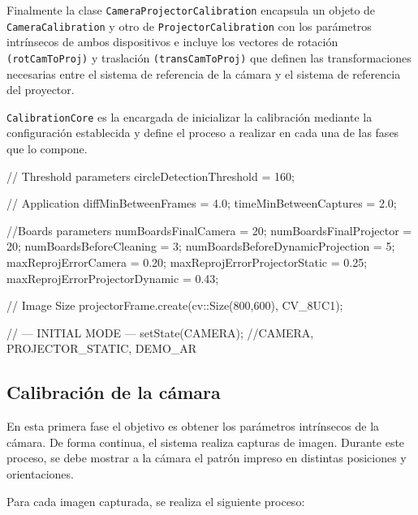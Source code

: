 Finalmente la clase \texttt{CameraProjectorCalibration} encapsula un objeto de  \texttt{CameraCalibration} y otro de \texttt{ProjectorCalibration} con los parámetros intrínsecos de ambos dispositivos e incluye los vectores de rotación \texttt{(rotCamToProj)} y traslación \texttt{(transCamToProj)} que definen las transformaciones necesarias entre el sistema de referencia de la cámara y el sistema de referencia del proyector. 

\texttt{CalibrationCore} es la encargada de inicializar la calibración mediante la configuración establecida y define el proceso a realizar en cada una de las fases que lo compone.

\begin{listing}[
  float=ht,
  language = C++,
  caption  = {Configuración de la clase CalibrationCore},
  label    = code:CalibCore]
  // Threshold parameters
  circleDetectionThreshold = 160;
 
  // Application
  diffMinBetweenFrames = 4.0; 
  timeMinBetweenCaptures = 2.0; 
 
  //Boards parameters
  numBoardsFinalCamera = 20;  
  numBoardsFinalProjector = 20;
  numBoardsBeforeCleaning = 3;  
  numBoardsBeforeDynamicProjection = 5; 
  maxReprojErrorCamera = 0.20;
  maxReprojErrorProjectorStatic = 0.25;
  maxReprojErrorProjectorDynamic = 0.43;

  // Image Size
  projectorFrame.create(cv::Size(800,600), CV_8UC1);
  
  // --- INITIAL MODE ---
  setState(CAMERA); //CAMERA, PROJECTOR_STATIC, DEMO_AR
\end{listing}
 
\subsection{Calibración de la cámara}
En esta primera fase el objetivo es obtener los parámetros intrínsecos de la cámara. De forma continua, el sistema realiza capturas de imagen. Durante este proceso, se debe mostrar a la cámara el patrón impreso en distintas posiciones y orientaciones. 

Para cada imagen capturada, se realiza el siguiente proceso:

